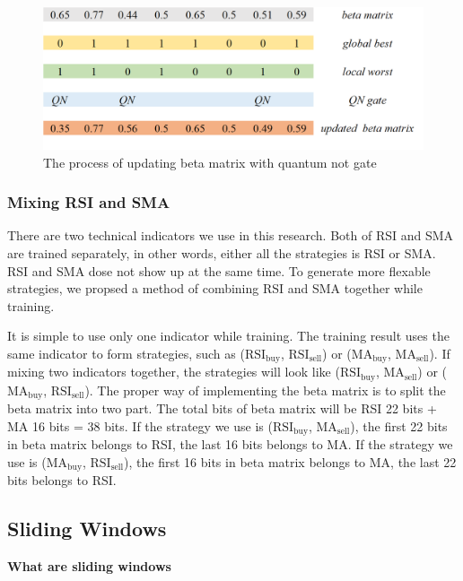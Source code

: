 \documentclass[../main.tex]{subfiles}
\begin{document}
\begin{figure}[H]
    \centering
    \includegraphics[scale = 0.5] {figure/GN_gate.png}
    \caption{The process of updating beta matrix with quantum not gate}
    \label{GN_gate}
\end{figure}

\subsubsection{Mixing RSI and SMA}

There are two technical indicators we use in this research. Both of RSI and SMA are trained separately, in other words, either all the strategies is RSI or SMA. RSI and SMA dose not show up at the same time. To generate more flexable strategies, we propsed a method of combining RSI and SMA together while training.

\bigbreak

It is simple to use only one indicator while training. The training result uses the same indicator to form strategies, such as ($\text{RSI}_\text{buy}$, $\text{RSI}_\text{sell}$) or ($\text{MA}_\text{buy}$, $\text{MA}_\text{sell}$). If mixing two indicators together, the strategies will look like ($\text{RSI}_\text{buy}$, $\text{MA}_\text{sell}$) or ($\text{MA}_\text{buy}$, $\text{RSI}_\text{sell}$).
The proper way of implementing the beta matrix is to split the beta matrix into two part. The total bits of beta matrix will be RSI 22 bits + MA 16 bits = 38 bits. If the strategy we use is ($\text{RSI}_\text{buy}$, $\text{MA}_\text{sell}$), the first 22 bits in beta matrix belongs to RSI, the last 16 bits belongs to MA. If the strategy we use is ($\text{MA}_\text{buy}$, $\text{RSI}_\text{sell}$), the first 16 bits in beta matrix belongs to MA, the last 22 bits belongs to RSI.

\subsection{Sliding Windows}
\textbf{What are sliding windows}
\end{document}
